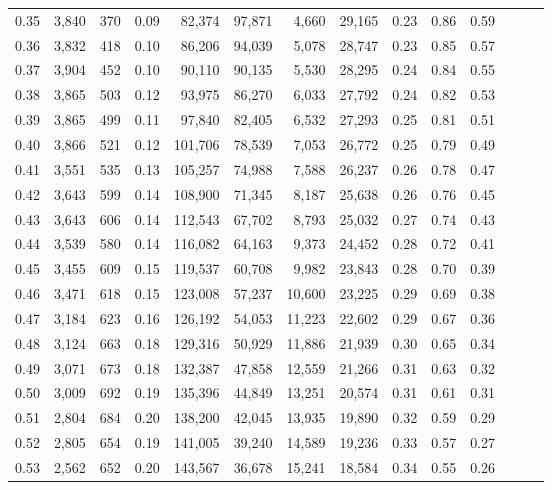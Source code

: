 \begin{tabular}{rrrrrrrrrrrrrr}
0.35 &  3,840 &  370 &  0.09 &   82,374 &   97,871 &   4,660 &  29,165 &  0.23 &  0.86 &      0.59 \\
0.36 &  3,832 &  418 &  0.10 &   86,206 &   94,039 &   5,078 &  28,747 &  0.23 &  0.85 &      0.57 \\
0.37 &  3,904 &  452 &  0.10 &   90,110 &   90,135 &   5,530 &  28,295 &  0.24 &  0.84 &      0.55 \\
0.38 &  3,865 &  503 &  0.12 &   93,975 &   86,270 &   6,033 &  27,792 &  0.24 &  0.82 &      0.53 \\
0.39 &  3,865 &  499 &  0.11 &   97,840 &   82,405 &   6,532 &  27,293 &  0.25 &  0.81 &      0.51 \\
0.40 &  3,866 &  521 &  0.12 &  101,706 &   78,539 &   7,053 &  26,772 &  0.25 &  0.79 &      0.49 \\
0.41 &  3,551 &  535 &  0.13 &  105,257 &   74,988 &   7,588 &  26,237 &  0.26 &  0.78 &      0.47 \\
0.42 &  3,643 &  599 &  0.14 &  108,900 &   71,345 &   8,187 &  25,638 &  0.26 &  0.76 &      0.45 \\
0.43 &  3,643 &  606 &  0.14 &  112,543 &   67,702 &   8,793 &  25,032 &  0.27 &  0.74 &      0.43 \\
0.44 &  3,539 &  580 &  0.14 &  116,082 &   64,163 &   9,373 &  24,452 &  0.28 &  0.72 &      0.41 \\
0.45 &  3,455 &  609 &  0.15 &  119,537 &   60,708 &   9,982 &  23,843 &  0.28 &  0.70 &      0.39 \\
0.46 &  3,471 &  618 &  0.15 &  123,008 &   57,237 &  10,600 &  23,225 &  0.29 &  0.69 &      0.38 \\
0.47 &  3,184 &  623 &  0.16 &  126,192 &   54,053 &  11,223 &  22,602 &  0.29 &  0.67 &      0.36 \\
0.48 &  3,124 &  663 &  0.18 &  129,316 &   50,929 &  11,886 &  21,939 &  0.30 &  0.65 &      0.34 \\
0.49 &  3,071 &  673 &  0.18 &  132,387 &   47,858 &  12,559 &  21,266 &  0.31 &  0.63 &      0.32 \\
0.50 &  3,009 &  692 &  0.19 &  135,396 &   44,849 &  13,251 &  20,574 &  0.31 &  0.61 &      0.31 \\
0.51 &  2,804 &  684 &  0.20 &  138,200 &   42,045 &  13,935 &  19,890 &  0.32 &  0.59 &      0.29 \\
0.52 &  2,805 &  654 &  0.19 &  141,005 &   39,240 &  14,589 &  19,236 &  0.33 &  0.57 &      0.27 \\
0.53 &  2,562 &  652 &  0.20 &  143,567 &   36,678 &  15,241 &  18,584 &  0.34 &  0.55 &      0.26 \\

\end{tabular}

